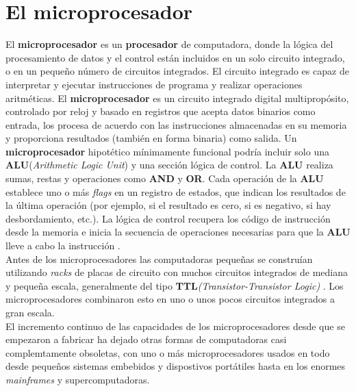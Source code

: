 \chapter{El microprocesador}\label{chapter:microprocesador}

El \textbf{microprocesador} es un \textbf{procesador} de computadora, donde la lógica del procesamiento de datos y el control
están incluidos en un solo circuito integrado, o en un pequeño número de circuitos integrados. El circuito integrado es capaz 
de interpretar y ejecutar instrucciones de programa y realizar operaciones aritméticas. El \textbf{microprocesador} es un 
circuito integrado digital multipropósito, controlado por reloj y basado en registros que acepta datos binarios como entrada, 
los procesa de acuerdo con las instrucciones almacenadas en su memoria y proporciona resultados (también en forma binaria) 
como salida. Un \textbf{microprocesador} hipotético mínimamente funcional podría incluir solo una \textbf{ALU}(\emph{Arithmetic Logic Unit}) 
y una sección lógica de control. La \textbf{ALU} realiza sumas, restas y operaciones como \textbf{AND} y \textbf{OR}. Cada operación de la
\textbf{ALU} establece uno o más \emph{flags} en un registro de estados, que indican los resultados de la última operación
(por ejemplo, si el resultado es cero, si es negativo, si hay desbordamiento, etc.). La lógica de control recupera los
código de instrucción desde la memoria e inicia la secuencia de operaciones necesarias para que la \textbf{ALU} lleve a
cabo la instrucción .\\ Antes de los microprocesadores las computadoras pequeñas
se construían utilizando  \emph{racks} de placas de circuito con muchos circuitos integrados de mediana y pequeña escala,
generalmente del tipo \textbf{TTL}\emph{(Transistor-Transistor Logic)} . Los microprocesadores
combinaron esto en uno o unos pocos circuitos integrados a gran escala.\\ El incremento continuo de las capacidades de los
microprocesadores desde  que se empezaron a fabricar ha dejado otras formas de computadoras casi complemtamente obsoletas,
con uno o más microprocesadores usados en todo desde pequeños sistemas embebidos y dispostivos portátiles hasta en los enormes
\emph{mainframes} y supercomputadoras.

